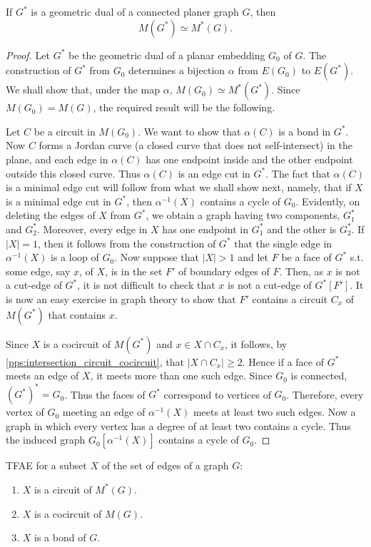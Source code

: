 \documentclass[a4paper,10pt]{article}
\begin{document}
\begin{lemma}[lem:]{}
  If $G^*$ is a geometric dual of a connected planer graph $G$, then
  \[
    M(G^*)\simeq M^*(G).
  \]
  \vspace{-2em}
  \begin{proof}
    Let $G^*$ be the geometric dual of a planar embedding $G_0$ of $G$. The construction of $G^*$ from $G_0$ determines a bijection $\alpha$ from $E(G_0)$ to $E(G^*)$. We shall show that, under the map $\alpha$, $M(G_0)\simeq M^*(G^*)$. Since $M(G_0)=M(G)$, the required result will be the following.

    Let $C$ be a circuit in $M(G_0)$. We want to show that $\alpha(C)$ is a bond in $G^*$. Now $C$ forms a Jordan curve (a closed curve that does not self-intersect) in the plane, and each edge in $\alpha(C)$ has one endpoint inside and the other endpoint outside this closed curve. Thus $\alpha(C)$ is an edge cut in $G^*$. The fact that $\alpha(C)$ is a minimal edge cut will follow from what we shall show next, namely, that if $X$ is a minimal edge cut in $G^*$, then $\alpha^{-1}(X)$ contains a cycle of $G_0$. Evidently, on deleting the edges of $X$ from $G^*$, we obtain a graph having two components, $G_1^*$ and $G_2^*$. Moreover, every edge in $X$ has one endpoint in $G_1^*$ and the other is $G_2^*$. If $|X|=1$, then it follows from the construction of $G^*$ that the single edge in $\alpha^{-1}(X)$ is a loop of $G_0$. Now suppose that $|X|>1$ and let $F$ be a face of $G^*$ s.t. some edge, say $x$, of $X$, is in the set $F'$ of boundary edges of $F$. Then, as $x$ is not a cut-edge of $G^*$, it is not difficult to check that $x$ is not a cut-edge of $G^*[F']$. It is now an easy exercise in graph theory to show that $F'$ contains a circuit $C_x$ of $M(G^*)$ that contains $x$. 

    Since $X$ is a cocircuit of $M(G^*)$ and $x\in X\cap C_x$, it follows, by \cref{pps:intersection_circuit_cocircuit}, that $|X\cap C_x|\geq 2$. Hence if a face of $G^*$ meets an edge of $X$, it meets more than one such edge. Since $G_0$ is connected, $(G^*)^*=G_0$. Thus the faces of $G^*$ correspond to vertices of $G_0$. Therefore, every vertex of $G_0$ meeting an edge of $\alpha^{-1}(X)$ meets at least two such edges. Now a graph in which every vertex has a degree of at least two contains a cycle. Thus the induced graph $G_0[\alpha^{-1}(X)]$ contains a cycle of $G_0$. 
  \end{proof}
\end{lemma}

\begin{corollary}[crl:]{}
  TFAE for a subset $X$ of the set of edges of a graph $G$:
  \begin{enumerate}
    \item $X$ is a circuit of $M^*(G)$.
    \item $X$ is a cocircuit of $M(G)$.
    \item $X$ is a bond of $G$.
  \end{enumerate}
\end{corollary}
\end{document}
